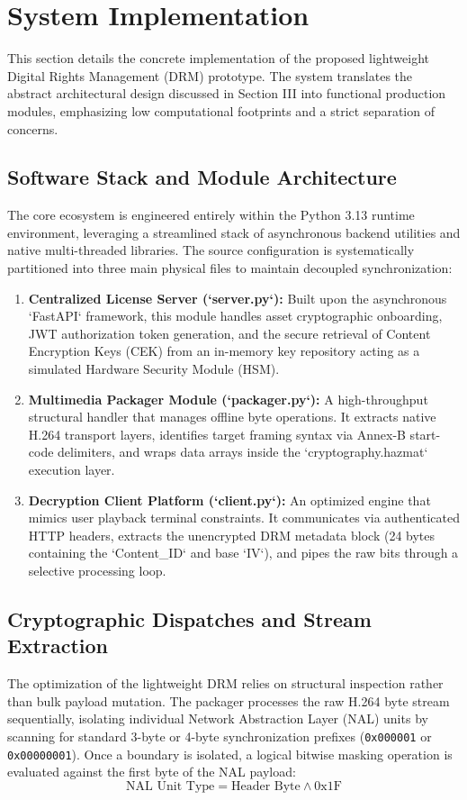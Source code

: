 \section{System Implementation}
This section details the concrete implementation of the proposed lightweight Digital Rights Management (DRM) prototype. The system translates the abstract architectural design discussed in Section III into functional production modules, emphasizing low computational footprints and a strict separation of concerns.

\subsection{Software Stack and Module Architecture}
The core ecosystem is engineered entirely within the Python 3.13 runtime environment, leveraging a streamlined stack of asynchronous backend utilities and native multi-threaded libraries. The source configuration is systematically partitioned into three main physical files to maintain decoupled synchronization:
\begin{enumerate}
    \item \textbf{Centralized License Server (`server.py`):} Built upon the asynchronous `FastAPI` framework, this module handles asset cryptographic onboarding, JWT authorization token generation, and the secure retrieval of Content Encryption Keys (CEK) from an in-memory key repository acting as a simulated Hardware Security Module (HSM).
    \item \textbf{Multimedia Packager Module (`packager.py`):} A high-throughput structural handler that manages offline byte operations. It extracts native H.264 transport layers, identifies target framing syntax via Annex-B start-code delimiters, and wraps data arrays inside the `cryptography.hazmat` execution layer.
    \item \textbf{Decryption Client Platform (`client.py`):} An optimized engine that mimics user playback terminal constraints. It communicates via authenticated HTTP headers, extracts the unencrypted DRM metadata block (24 bytes containing the `Content\_ID` and base `IV`), and pipes the raw bits through a selective processing loop.
\end{enumerate}

\subsection{Cryptographic Dispatches and Stream Extraction}
The optimization of the lightweight DRM relies on structural inspection rather than bulk payload mutation. The packager processes the raw H.264 byte stream sequentially, isolating individual Network Abstraction Layer (NAL) units by scanning for standard 3-byte or 4-byte synchronization prefixes (\texttt{0x000001} or \texttt{0x00000001}). Once a boundary is isolated, a logical bitwise masking operation is evaluated against the first byte of the NAL payload:
\begin{equation}
\text{NAL Unit Type} = \text{Header Byte} \land \text{0x1F}
\end{equation}

